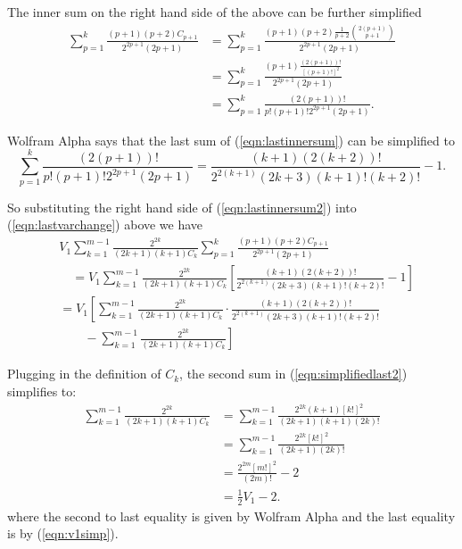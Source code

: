 \documentclass[11pt]{article}
\theoremstyle{definition}
\theoremstyle{definition}
\theoremstyle{plain}
\theoremstyle{plain}
\theoremstyle{plain}
\theoremstyle{definition}
\theoremstyle{definition}
\begin{document}
{The inner sum on the right hand side of the above can be further simplified
\begin{equation}\label{eqn:lastinnersum}
\begin{aligned}
\sum\limits_{p=1}^k\frac{(p+1)(p+2)C_{p+1}}{2^{2p+1}(2p+1)} &= \sum\limits_{p=1}^k\frac{(p+1)(p+2)\frac{1}{p+2}\binom{2(p+1)}{p+1}}{2^{2p+1}(2p+1)} \\
&= \sum\limits_{p=1}^k\frac{(p+1)\frac{(2(p+1))!}{[(p+1)!]^2}}{2^{2p+1}(2p+1)} \\
&= \sum\limits_{p=1}^k\frac{(2(p+1))!}{p!(p+1)!2^{2p+1}(2p+1)}.
\end{aligned}
\end{equation}

Wolfram Alpha says that the last sum of (\ref{eqn:lastinnersum}) can be simplified to
\begin{equation}\label{eqn:lastinnersum2}
\sum\limits_{p=1}^k\frac{(2(p+1))!}{p!(p+1)!2^{2p+1}(2p+1)} = \frac{(k+1)(2(k+2))!}{2^{2(k+1)}(2k+3)(k+1)!(k+2)!}-1.
\end{equation}

So substituting the right hand side of (\ref{eqn:lastinnersum2}) into (\ref{eqn:lastvarchange}) above we have
\begin{equation}\label{eqn:simplifiedlast2}
\begin{aligned}
&V_1\sum\limits_{k=1}^{m-1}\frac{2^{2k}}{(2k+1)(k+1)C_k}\sum\limits_{p=1}^k\frac{(p+1)(p+2)C_{p+1}}{2^{2p+1}(2p+1)} \\
&\quad=V_1\sum\limits_{k=1}^{m-1}\frac{2^{2k}}{(2k+1)(k+1)C_k}\left[\frac{(k+1)(2(k+2))!}{2^{2(k+1)}(2k+3)(k+1)!(k+2)!}-1\right] \\
&= V_1\left[\sum\limits_{k=1}^{m-1}\frac{2^{2k}}{(2k+1)(k+1)C_k}\cdot\frac{(k+1)(2(k+2))!}{2^{2(k+1)}(2k+3)(k+1)!(k+2)!}\right. \\
&\qquad - \left.\sum\limits_{k=1}^{m-1}\frac{2^{2k}}{(2k+1)(k+1)C_k}\right]
\end{aligned}
\end{equation}

Plugging in the definition of $C_k$, the second sum in (\ref{eqn:simplifiedlast2}) simplifies to:
\begin{equation}\label{eqn:lastsecond}
\begin{aligned}
\sum\limits_{k=1}^{m-1}\frac{2^{2k}}{(2k+1)(k+1)C_k} &= \sum\limits_{k=1}^{m-1}\frac{2^{2k}(k+1)[k!]^2}{(2k+1)(k+1)(2k)!} \\
&= \sum\limits_{k=1}^{m-1}\frac{2^{2k}[k!]^2}{(2k+1)(2k)!} \\
&= \frac{2^{2m}[m!]^2}{(2m)!}-2 \\
&= \frac{1}{2}V_1 - 2.
\end{aligned}
\end{equation}
where the second to last equality is given by Wolfram Alpha and the last equality is by (\ref{eqn:v1simp}).

}
\end{document}
